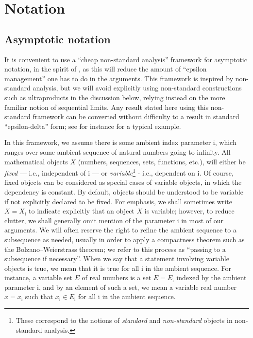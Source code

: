 \documentclass[a4paper, 10pt]{amsart}
\newcommand{\ii}{{\mathrm{i}}}
\begin{document}
\section{Notation}

\subsection{Asymptotic notation}\label{notation-sec}

It is convenient to use a ``cheap non-standard analysis'' framework for asymptotic notation, in the spirit of \cite{tao-cheap}, as this will reduce the amount of ``epsilon management'' one has to do in the arguments.  This framework is inspired by non-standard analysis, but we will avoid explicitly using non-standard constructions such as ultraproducts in the discussion below, relying instead on the more familiar notion of sequential limits.  Any result stated here using this non-standard framework can be converted without difficulty to a result in standard ``epsilon-delta'' form; see for instance  for a typical example.

In this framework, we assume there is some ambient index parameter $\ii$, which ranges over some ambient sequence of natural numbers going to infinity.  All mathematical objects $X$ (numbers, sequences, sets, functions, etc.), will either be \emph{fixed} --- i.e., independent of $\ii$ --- or \emph{variable}\footnote{These correspond to the notions of \emph{standard} and \emph{non-standard} objects in non-standard analysis.} - i.e., dependent on $\ii$.    Of course, fixed objects can be considered as special cases of variable objects, in which the dependency is constant.  By default, objects should be understood to be variable if not explicitly declared to be fixed. For emphasis, we shall sometimes write $X = X_{\ii}$ to indicate explicitly that an object $X$ is variable; however, to reduce clutter, we shall generally omit mention of the parameter $\ii$ in most of our arguments. We will often reserve the right to refine the ambient sequence to a subsequence as needed, usually in order to apply a compactness theorem such as the Bolzano--Weierstrass theorem; we refer to this process as ``passing to a subsequence if necessary''.  When we say that a statement involving variable objects is true, we mean that it is true for all $\ii$ in the ambient sequence.
For instance, a variable set $E$ of real numbers is a set $E = E_{\ii}$ indexed by the ambient parameter $\ii$, and by an element of such a set, we mean a variable real number $x = x_{\ii}$ such that $x_{\ii} \in E_{\ii}$ for all $\ii$ in the ambient sequence.
\end{document}
